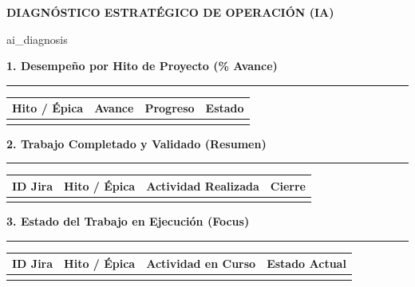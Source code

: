 \documentclass[10pt,a4paper]{article}
\newcommand{\sectiontitle}[1]{%
  \vspace{12pt}%
  {\large\bfseries\color{smblack}#1}%
  \vspace{2pt}%
  \textcolor{smprimary}{\rule{\textwidth}{2pt}}%
  \vspace{6pt}%
}
\begin{document}
{%
\vspace{6mm}
\noindent\colorbox{yellow!10}{%
    \parbox{\dimexpr\textwidth-2\fboxsep\relax}{%
        \vspace{2pt}\textbf{DIAGN\'OSTICO ESTRAT\'EGICO DE OPERACI\'ON (IA)}\vspace{3pt}
        
        \small{{ ai_diagnosis }}
        \vspace{2pt}
    }%
}
{%

\sectiontitle{1. Desempe\~no por Hito de Proyecto (\% Avance)}

\noindent\begin{tabularx}{\textwidth}{@{}p{4cm} c c p{2.5cm}@{}}
    \toprule
    \rowcolor{smblack}\color{white}\textbf{Hito / \'Epica} & \color{white}\textbf{Avance} & \color{white}\textbf{Progreso} & \color{white}\textbf{Estado} \\
    \midrule
    {%
    \textbf{{%
    {%
    {%
    \bottomrule
\end{tabularx}

\sectiontitle{2. Trabajo Completado y Validado (Resumen)}

\noindent\begin{tabularx}{\textwidth}{@{}p{1.8cm} p{3cm} X p{2cm}@{}}
    \toprule
    \rowcolor{smblack}\color{white}\textbf{ID Jira} & \color{white}\textbf{Hito / \'Epica} & \color{white}\textbf{Actividad Realizada} & \color{white}\textbf{Cierre} \\
    \midrule
    {%
    \textbf{{%
    {%
    \bottomrule
\end{tabularx}

\sectiontitle{3. Estado del Trabajo en Ejecuci\'on (Focus)}

\noindent\begin{tabularx}{\textwidth}{@{}p{1.8cm} p{3cm} X p{2cm}@{}}
    \toprule
    \rowcolor{smblack}\color{white}\textbf{ID Jira} & \color{white}\textbf{Hito / \'Epica} & \color{white}\textbf{Actividad en Curso} & \color{white}\textbf{Estado Actual} \\
    \midrule
    {%
    \textbf{{%
    {%
    \bottomrule
\end{tabularx}

}}
\end{document}
